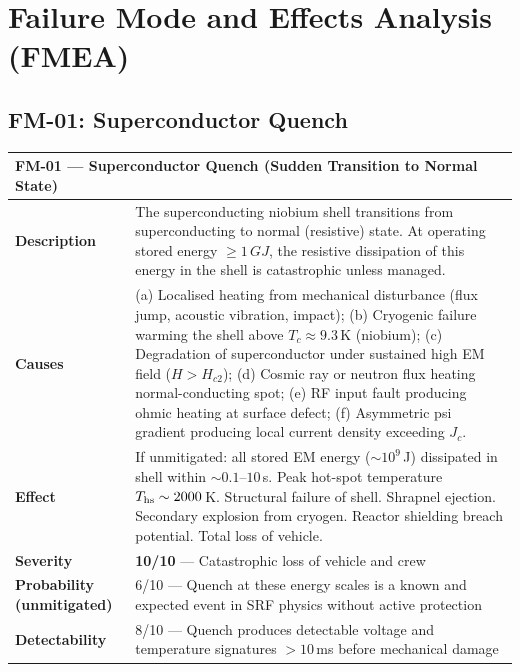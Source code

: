 \documentclass[11pt,a4paper]{article}
\newcommand{\Scrit}[1]{\cellcolor{risk-critical!40}\textbf{#1}}
\begin{document}
\section{Failure Mode and Effects Analysis (FMEA)}

\subsection{FM-01: Superconductor Quench}

\begin{longtable}{p{0.25\tw}p{0.65\tw}}
\toprule
\multicolumn{2}{l}{\textbf{FM-01 --- Superconductor Quench (Sudden Transition
  to Normal State)}} \\
\midrule
\endhead
\textbf{Description} &
  The superconducting niobium shell transitions from superconducting to
  normal (resistive) state. At operating stored energy $\geq 1\,\si{GJ}$,
  the resistive dissipation of this energy in the shell is catastrophic
  unless managed. \\[4pt]
\textbf{Causes} &
  (a) Localised heating from mechanical disturbance (flux jump, acoustic
  vibration, impact); (b) Cryogenic failure warming the shell above
  $T_c \approx 9.3$\,K (niobium); (c) Degradation of superconductor under
  sustained high EM field ($H > H_{c2}$); (d) Cosmic ray or neutron
  flux heating normal-conducting spot; (e) RF input fault producing
  ohmic heating at surface defect; (f) Asymmetric psi gradient producing
  local current density exceeding $J_c$. \\[4pt]
\textbf{Effect} &
  If unmitigated: all stored EM energy ($\sim 10^9$\,J) dissipated in
  shell within $\sim 0.1$--$10$\,s. Peak hot-spot temperature $T_{\rm hs}
  \sim 2000$\,K. Structural failure of shell. Shrapnel ejection.
  Secondary explosion from cryogen. Reactor shielding breach potential.
  Total loss of vehicle. \\[4pt]
\textbf{Severity} & \Scrit{10/10} --- Catastrophic loss of vehicle and crew \\[4pt]
\textbf{Probability (unmitigated)} & 6/10 --- Quench at these energy scales
  is a known and expected event in SRF physics without active protection \\[4pt]
\textbf{Detectability} & 8/10 --- Quench produces detectable voltage and
  temperature signatures $>10$\,ms before mechanical damage \\[4pt]

\end{longtable}
\end{document}
